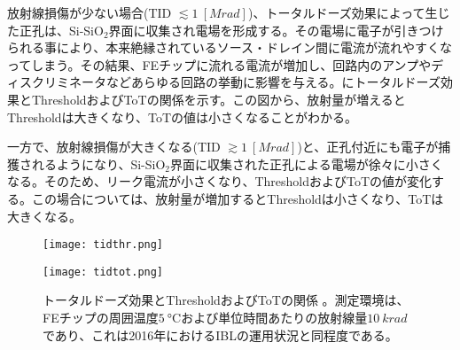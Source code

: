 放射線損傷が少ない場合(TID $\lesssim 1\ [\si{Mrad}]$)、トータルドーズ効果によって生じた正孔は、Si-SiO$_{2}$界面に収集され電場を形成する。その電場に電子が引きつけられる事により、本来絶縁されているソース・ドレイン間に電流が流れやすくなってしまう。その結果、FEチップに流れる電流が増加し、回路内のアンプやディスクリミネータなどあらゆる回路の挙動に影響を与える。にトータルドーズ効果とThresholdおよびToTの関係を示す。この図から、放射量が増えるとThresholdは大きくなり、ToTの値は小さくなることがわかる。

一方で、放射線損傷が大きくなる(TID $\gtrsim 1\ [\si{Mrad}]$)と、正孔付近にも電子が捕獲されるようになり、Si-SiO$_{2}$界面に収集された正孔による電場が徐々に小さくなる。そのため、リーク電流が小さくなり、ThresholdおよびToTの値が変化する。この場合については、放射量が増加するとThresholdは小さくなり、ToTは大きくなる。

\begin{figure}[tbp]
  \begin{minipage}[b]{0.5\linewidth}
    \centering
    \texttt{[image: tidthr.png]}
  \end{minipage}
  \begin{minipage}[b]{0.5\linewidth}
    \centering
    \texttt{[image: tidtot.png]}
  \end{minipage}
  \caption[トータルドーズ効果とThresholdおよびToTの関係]{トータルドーズ効果とThresholdおよびToTの関係 \cite{tid}。測定環境は、FEチップの周囲温度$5\ \si{\degreeCelsius}$および単位時間あたりの放射線量$10\ \si{krad}$であり、これは2016年におけるIBLの運用状況と同程度である。}
  \label{fig:tidhennka}
\end{figure}




